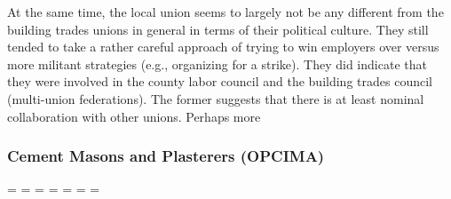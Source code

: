 \documentclass[12pt]{article}
\begin{document}
At the same time, the local union seems to largely not be any different from the building trades unions in general in terms of their political culture. They still tended to take a rather careful approach of trying to win employers over versus more militant strategies (e.g., organizing for a strike). They did indicate that they were involved in the county labor council and the building trades council (multi-union federations). The former suggests that there is at least nominal collaboration with other unions. Perhaps more 



\subsubsection{Cement Masons and Plasterers (OPCIMA)}


\clearpage

\titleformat{\section}{\fontsize{12}{14}\bfseries\centering}{\thesection}{0.5em}{}
\printbibliography[heading=bibintoc]
\clearpage

\printglossary[type=\acronymtype,title=Acronyms]



\clearpage

\paperwidth=\pdfpageheight
\paperheight=\pdfpagewidth
\pdfpageheight=\paperheight
\pdfpagewidth=\paperwidth
\headwidth=\textheight
\begingroup 
\vsize=\textwidth
\hsize=\textheight
\end{document}
